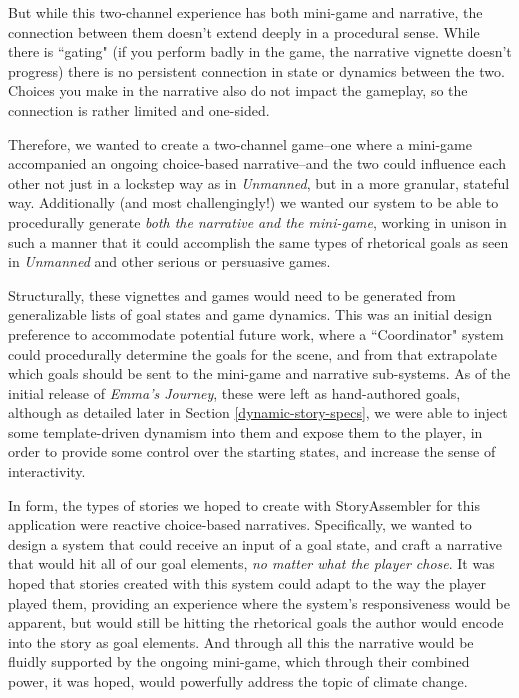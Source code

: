 But while this two-channel experience has both mini-game and narrative, the connection between them doesn't extend deeply in a procedural sense. While there is ``gating" (if you perform badly in the game, the narrative vignette doesn't progress) there is no persistent connection in state or dynamics between the two. Choices you make in the narrative also do not impact the gameplay, so the connection is rather limited and one-sided.

Therefore, we wanted to create a two-channel game--one where a mini-game accompanied an ongoing choice-based narrative--and the two could influence each other not just in a lockstep way as in \textit{Unmanned}, but in a more granular, stateful way. Additionally (and most challengingly!) we wanted our system to be able to procedurally generate \textit{both the narrative and the mini-game}, working in unison in such a manner that it could accomplish the same types of rhetorical goals as seen in \textit{Unmanned} and other serious or persuasive games.

Structurally, these vignettes and games would need to be generated from generalizable lists of goal states and game dynamics. This was an initial design preference to accommodate potential future work, where a ``Coordinator" system could procedurally determine the goals for the scene, and from that extrapolate which goals should be sent to the mini-game and narrative sub-systems. As of the initial release of \textit{Emma's Journey}, these were left as hand-authored goals, although as detailed later in Section \ref{dynamic-story-specs}, we were able to inject some template-driven dynamism into them and expose them to the player, in order to provide some control over the starting states, and increase the sense of interactivity.

In form, the types of stories we hoped to create with StoryAssembler for this application were reactive choice-based narratives. Specifically, we wanted to design a system that could receive an input of a goal state, and craft a narrative that would hit all of our goal elements, \textit{no matter what the player chose}. It was hoped that stories created with this system could adapt to the way the player played them, providing an experience where the system's responsiveness would be apparent, but would still be hitting the rhetorical goals the author would encode into the story as goal elements. And through all this the narrative would be fluidly supported by the ongoing mini-game, which through their combined power, it was hoped, would powerfully address the topic of climate change.

